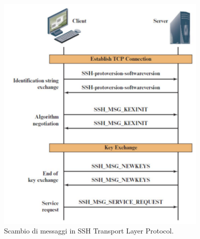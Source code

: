 \begin{figure}
    \centering
    \includegraphics[width=0.9\textwidth]{images/chapter5/5-4.png}
    \caption{Scambio di messaggi in SSH Transport Layer Protocol.}
    \label{fig:5-4}
\end{figure}

